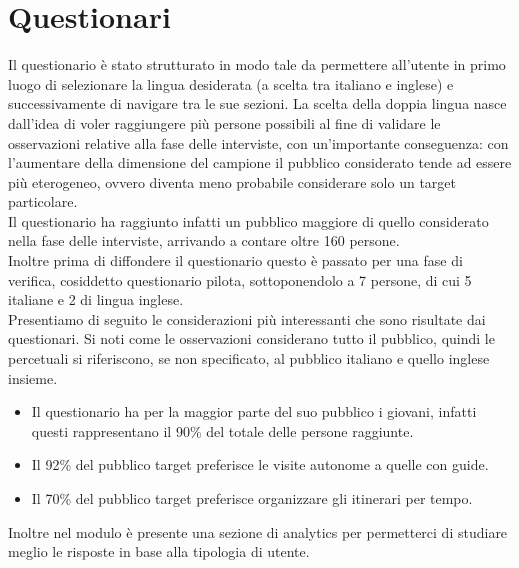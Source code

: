 \section{Questionari}

Il questionario è stato strutturato in modo tale da permettere all'utente in primo luogo di selezionare la lingua desiderata (a scelta tra italiano e inglese) e successivamente di navigare tra le sue sezioni. La scelta della doppia lingua nasce dall'idea di voler 
raggiungere più persone possibili al fine di validare le osservazioni relative alla fase delle interviste, con un'importante conseguenza: con l'aumentare della dimensione del campione il pubblico considerato tende ad essere più eterogeneo, ovvero diventa meno probabile considerare solo un target particolare. \\

Il questionario ha raggiunto infatti un pubblico maggiore di quello considerato nella fase delle interviste, arrivando a contare oltre 160 persone. \\

Inoltre prima di diffondere il questionario questo è passato per una fase di verifica, cosiddetto questionario pilota, sottoponendolo a 7 persone, di cui 5 italiane e 2 di lingua inglese.\\

Presentiamo di seguito le considerazioni più interessanti che sono risultate dai questionari. Si noti come le osservazioni considerano tutto il pubblico, quindi le percetuali si riferiscono, se non specificato, al pubblico italiano e quello inglese insieme.

\begin{itemize}

\item Il questionario ha per la maggior parte del suo pubblico i giovani, infatti questi rappresentano il 90\% del totale delle persone raggiunte.

\item Il 92\% del pubblico target preferisce le visite autonome a quelle con guide.

\item Il 70\% del pubblico target preferisce organizzare gli itinerari per tempo.

\end{itemize}


Inoltre nel modulo è presente una sezione di analytics per permetterci di studiare meglio le risposte in base alla tipologia di utente.\\

